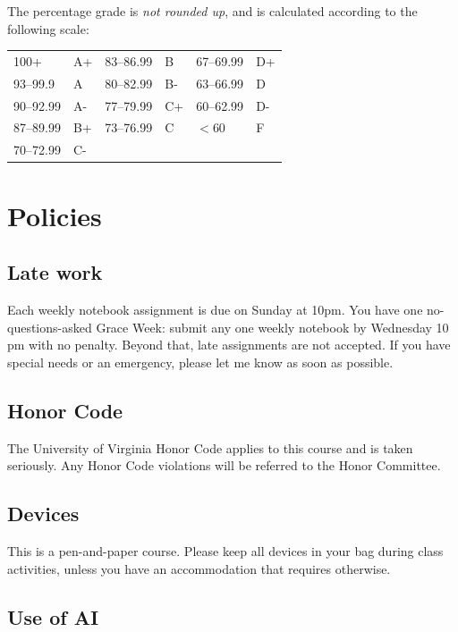 \documentclass[oneside,11pt]{amsart}
\begin{document}
The percentage grade is \emph{not rounded up}, and is calculated 
according to the following scale:
\begin{center}
\begin{tabular}{ll|ll|ll}
100+ & A+ & 83--86.99 & B & 67--69.99 & D+ \\
93--99.9 & A & 80--82.99 & B- & 63--66.99 & D \\
90--92.99 & A- & 77--79.99 & C+ & 60--62.99 & D- \\
87--89.99 & B+ & 73--76.99 & C & $<60$ & F \\
70--72.99 & C- & & \\
\end{tabular}
\end{center}


\section{Policies}

\subsection{Late work}

Each weekly notebook assignment is due on Sunday at 10pm.
You have one no-questions-asked Grace Week: submit any one weekly notebook by Wednesday 10 pm with no penalty. Beyond that,
late assignments are not accepted. 
If you have special needs or an emergency, please let me know as soon as possible.

\subsection{Honor Code}
The University of Virginia Honor Code applies to this course and is taken seriously. Any Honor Code violations will be referred to the Honor Committee. 

\subsection{Devices}

This is a pen-and-paper course. Please keep all devices in your bag during class activities, unless you have an accommodation that requires otherwise.

\subsection{Use of AI}
\end{document}

